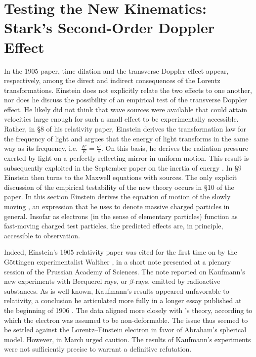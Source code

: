 \documentclass[submitted,12pt]{article}
\begin{document}
\section{Testing the New Kinematics: Stark’s Second-Order Doppler Effect}



In the 1905 paper, time dilation and the transverse Doppler effect appear, respectively, among the direct and indirect consequences of the Lorentz transformations. Einstein does not explicitly relate the two effects to one another, nor does he discuss the possibility of an empirical test of the transverse Doppler effect. He likely did not think that wave sources were available that could attain velocities large enough for such a small effect to be experimentally accessible. Rather, in \S8 of his relativity paper, Einstein derives the transformation law for the frequency of light and argues that the energy of light transforms in the same way as its frequency, i.e.\ $\frac{E'}{E}=\frac{\nu'}{\nu}$. On this basis, he derives the radiation pressure exerted by light on a perfectly reflecting mirror in uniform motion. This result is subsequently exploited in the September paper on the inertia of energy \citep{Einstein1905b}. In \S9 Einstein then turns to the Maxwell equations with sources. The only explicit discussion of the empirical testability of the new theory occurs in \S10 of the paper. In this section Einstein derives the equation of motion of the slowly moving , an expression that he uses to denote massive charged particles in general. Insofar as electrons (in the sense of elementary particles) function as fast-moving charged test particles, the predicted effects are, in principle, accessible to observation.

Indeed, Einstein’s 1905 relativity paper was cited for the first time on  by the Göttingen experimentalist Walther \citet[954]{Kaufmann1905}, in a short note presented at a plenary session of the Prussian Academy of Sciences. The note reported on Kaufmann’s new experiments with Becquerel rays, or $\beta$-rays, emitted by radioactive substances. As is well known, Kaufmann’s results appeared unfavorable to relativity, a conclusion he articulated more fully in a longer essay published at the beginning of 1906 \citep{Kaufmann1906}. The data aligned more closely with \Abr's theory, according to which the electron was assumed to be non-deformable. The issue thus seemed to be settled against the Lorentz--Einstein electron in favor of Abraham’s spherical model. However, in March \citet{Planck1906a} urged caution. The results of Kaufmann’s experiments were not sufficiently precise to warrant a definitive refutation.
\end{document}
